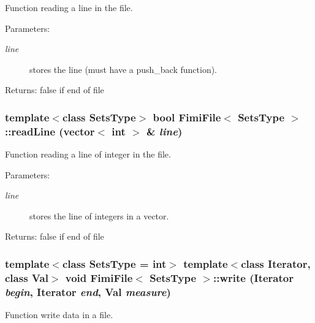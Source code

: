 Function reading a line in the file. 

\begin{Desc}
\item[Parameters:]
\begin{description}
\item[{\em line}]stores the line (must have a push\_\-back function). \end{description}
\end{Desc}
\begin{Desc}
\item[Returns:]false if end of file \end{Desc}
\subsubsection{\setlength{\rightskip}{0pt plus 5cm}template$<$class Sets\-Type$>$ bool {\bf Fimi\-File}$<$ Sets\-Type $>$::read\-Line (vector$<$ int $>$ \& {\em line})\hspace{0.3cm}{\tt  [protected]}}\label{class_fimi_file_63c9a00918ab05006ef1dae5380f3e1d}


Function reading a line of integer in the file. 

\begin{Desc}
\item[Parameters:]
\begin{description}
\item[{\em line}]stores the line of integers in a vector. \end{description}
\end{Desc}
\begin{Desc}
\item[Returns:]false if end of file \end{Desc}
\subsubsection{\setlength{\rightskip}{0pt plus 5cm}template$<$class Sets\-Type = int$>$ template$<$class Iterator, class Val$>$ void {\bf Fimi\-File}$<$ Sets\-Type $>$::write (Iterator {\em begin}, Iterator {\em end}, Val {\em measure})\hspace{0.3cm}{\tt  [protected]}}\label{class_fimi_file_359f265cd495d244b21d7c3bbe271620}


Function write data in a file. 

